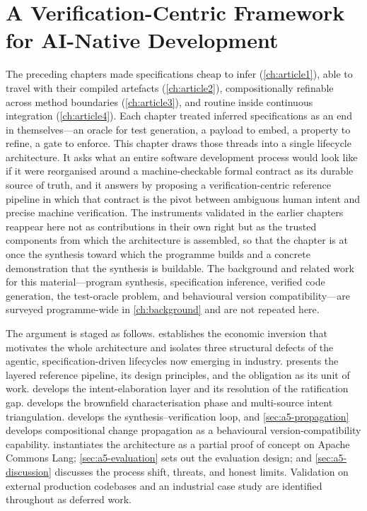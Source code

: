 \chapter{A Verification-Centric Framework for AI-Native Development}\label{ch:article5}

The preceding chapters made specifications cheap to infer (\cref{ch:article1}), able to travel with their compiled artefacts (\cref{ch:article2}), compositionally refinable across method boundaries (\cref{ch:article3}), and routine inside continuous integration (\cref{ch:article4}). Each chapter treated inferred specifications as an end in themselves---an oracle for test generation, a payload to embed, a property to refine, a gate to enforce. This chapter draws those threads into a single lifecycle architecture. It asks what an entire software development process would look like if it were reorganised around a machine-checkable formal contract as its durable source of truth, and it answers by proposing a verification-centric reference pipeline in which that contract is the pivot between ambiguous human intent and precise machine verification. The instruments validated in the earlier chapters reappear here not as contributions in their own right but as the trusted components from which the architecture is assembled, so that the chapter is at once the synthesis toward which the programme builds and a concrete demonstration that the synthesis is buildable. The background and related work for this material---program synthesis, specification inference, verified code generation, the test-oracle problem, and behavioural version compatibility---are surveyed programme-wide in \cref{ch:background} and are not repeated here.

The argument is staged as follows.  establishes the economic inversion that motivates the whole architecture and isolates three structural defects of the agentic, specification-driven lifecycles now emerging in industry.  presents the layered reference pipeline, its design principles, and the obligation as its unit of work.  develops the intent-elaboration layer and its resolution of the ratification gap.  develops the brownfield characterisation phase and multi-source intent triangulation.  develops the synthesis--verification loop, and \cref{sec:a5-propagation} develops compositional change propagation as a behavioural version-compatibility capability.  instantiates the architecture as a partial proof of concept on Apache Commons Lang; \cref{sec:a5-evaluation} sets out the evaluation design; and \cref{sec:a5-discussion} discusses the process shift, threats, and honest limits. Validation on external production codebases and an industrial case study are identified throughout as deferred work.

